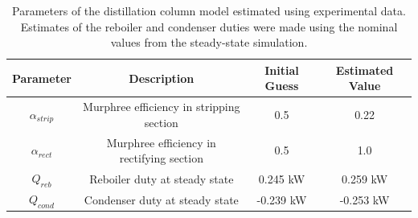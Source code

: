 \begin{table}
    \centering
    \caption{Parameters of the distillation column model estimated using experimental data. Estimates of the reboiler and condenser duties were made using the nominal values from the steady-state simulation.}
    \begin{tabular}{cccc}
        \textbf{Parameter} & \textbf{Description} & \textbf{Initial Guess} & \textbf{Estimated Value}  \\
        \hline
         $\alpha_{strip}$ & Murphree efficiency in stripping section &  0.5 & 0.22 \\ 
         $\alpha_{rect}$ & Murphree efficiency in rectifying section & 0.5 & 1.0 \\
         $ Q_{reb}$ & Reboiler duty at steady state &  0.245 kW  & 0.259 kW  \\
         $ Q_{cond}$ & Condenser duty at steady state &  -0.239 kW  & -0.253 kW \\
         \hline
    \end{tabular}

    \label{tab:param_estimation}
\end{table}

